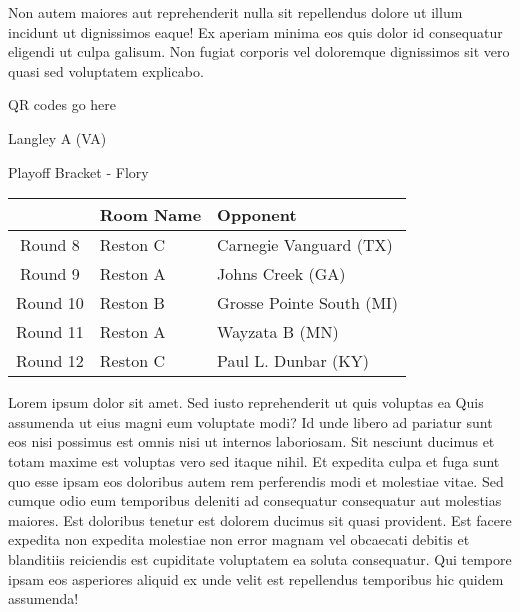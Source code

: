 \documentclass{article}%
\begin{document}
\newline%
Non autem maiores aut reprehenderit nulla sit repellendus dolore ut illum incidunt ut dignissimos eaque! Ex aperiam minima eos quis dolor id consequatur eligendi ut culpa galisum. Non fugiat corporis vel doloremque dignissimos sit vero quasi sed voluptatem explicabo.\newline%
\newline%
%
\vspace*{30pt}%
\begin{center}%
\begin{Huge}%
QR codes go here%
\end{Huge}%
\end{center}%
\newpage%
\begin{center}%
\begin{Huge}%
Langley A (VA)%
\end{Huge}%
\vspace*{8pt}%
\linebreak%
\begin{Large}%
Playoff Bracket {-} Flory%
\end{Large}%
\end{center}%
\begin{tabularx}{\textwidth}{|c|Y|Y|}%
\hline%
&Room Name&Opponent\\%
\hline%
Round 8&Reston C&Carnegie Vanguard (TX)\\%
Round 9&Reston A&Johns Creek (GA)\\%
Round 10&Reston B&Grosse Pointe South (MI)\\%
Round 11&Reston A&Wayzata B (MN)\\%
Round 12&Reston C&Paul L. Dunbar (KY)\\%
\hline%
\end{tabularx}%
\vspace*{8pt}%
\linebreak%
\newline%
\newline%
Lorem ipsum dolor sit amet. Sed iusto reprehenderit ut quis voluptas ea Quis assumenda ut eius magni eum voluptate modi? Id unde libero ad pariatur sunt eos nisi possimus est omnis nisi ut internos laboriosam. Sit nesciunt ducimus et totam maxime est voluptas vero sed itaque nihil. Et expedita culpa et fuga sunt quo esse ipsam eos doloribus autem rem perferendis modi et molestiae vitae.\newline%
\newline%
Sed cumque odio eum temporibus deleniti ad consequatur consequatur aut molestias maiores. Est doloribus tenetur est dolorem ducimus sit quasi provident. Est facere expedita non expedita molestiae non error magnam vel obcaecati debitis et blanditiis reiciendis est cupiditate voluptatem ea soluta consequatur. Qui tempore ipsam eos asperiores aliquid ex unde velit est repellendus temporibus hic quidem assumenda!\newline%
\end{document}

